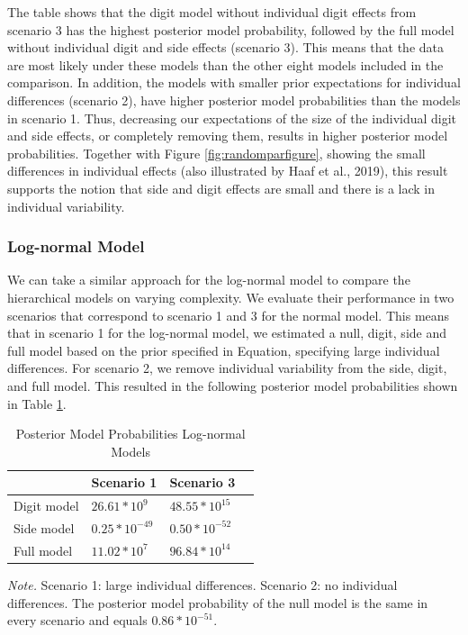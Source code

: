 \documentclass[
  english,
  doc,floatsintext]{apa6}
\begin{document}
The table shows that the digit model without individual digit effects from scenario 3 has the highest posterior model probability, followed by the full model without individual digit and side effects (scenario 3). This means that the data are most likely under these models than the other eight models included in the comparison. In addition, the models with smaller prior expectations for individual differences (scenario 2), have higher posterior model probabilities than the models in scenario 1. Thus, decreasing our expectations of the size of the individual digit and side effects, or completely removing them, results in higher posterior model probabilities. Together with Figure \ref{fig:randomparfigure}, showing the small differences in individual effects (also illustrated by Haaf et al., 2019), this result supports the notion that side and digit effects are small and there is a lack in individual variability.

\hypertarget{log-normal-model-3}{%
\subsubsection{Log-normal Model}\label{log-normal-model-3}}

We can take a similar approach for the log-normal model to compare the hierarchical models on varying complexity. We evaluate their performance in two scenarios that correspond to scenario 1 and 3 for the normal model. This means that in scenario 1 for the log-normal model, we estimated a null, digit, side and full model based on the prior specified in Equation, specifying large individual differences. For scenario 2, we remove individual variability from the side, digit, and full model. This resulted in the following posterior model probabilities shown in Table \ref{tab:postmodproblog}.

\begin{table}[H]
\caption{Posterior Model Probabilities Log-normal Models}
\label{tab:postmodproblog}
\begin{tabularx}{\textwidth}{XXXX}
\toprule
 & \multicolumn{1}{l}{Scenario 1} & \multicolumn{1}{l}{Scenario 3}\\
\midrule
Digit model & $26.61 * 10^9$ & $48.55 * 10^{15}$\\
Side model & $0.25 * 10^{-49}$  & $0.50 * 10^{-52}$ \\
Full model & $11.02 * 10^7$ &  $96.84 * 10^{14}$\\
\bottomrule
\end{tabularx}
\begin{tablenotes}[para]
\textit{Note.} Scenario 1: large individual differences. Scenario 2: no individual differences. The posterior model probability of the null model is the same in every scenario and equals $0.86*10^{-51}$. 
\end{tablenotes}
\end{table}
\end{document}
